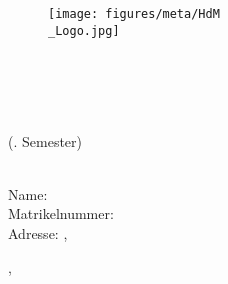 \makeatletter
\begin{titlepage}
	\begin{center}
		\begin{figure}
			\centering
			\texttt{[image: figures/meta/HdM\\\_Logo.jpg]} \\
		\end{figure}
		\vspace{1cm}
		\huge
		\textbf{\documentTitle} \\
		[0.5cm]
		\Large
		\documentSubtitle \\
		[2cm]
		\large
		\univercity \\ \faculty \\ (\semesterNumber. Semester) \\ \semesterSeason\:\the\year{} \\
		\vspace{7cm}
	\end{center}
	\begin{flushleft}
		Name: \forename\:\surname \\
		Matrikelnummer: \matriculationNumber \\
		Adresse: \street\:\housenumber, \zip\:\city		
	\end{flushleft}
	\vspace{1.2cm}
	\begin{center}
		\city, \documentDate
	\end{center}
\end{titlepage}
\makeatother